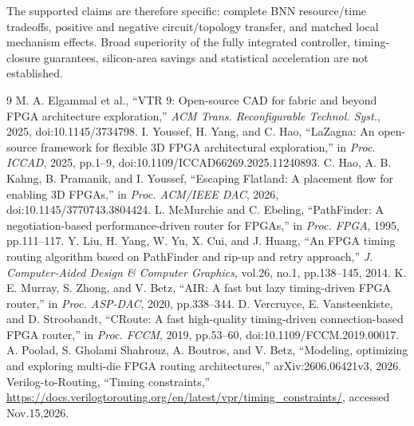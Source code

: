 \documentclass[conference,10pt]{IEEEtran}
\begin{document}
The supported claims are therefore specific: complete BNN resource/time tradeoffs, positive and negative circuit/topology transfer, and matched local mechanism effects. Broad superiority of the fully integrated controller, timing-closure guarantees, silicon-area savings and statistical acceleration are not established.
\begin{thebibliography}{9}
 M. A. Elgammal et al., ``VTR 9: Open-source CAD for fabric and beyond FPGA architecture exploration,'' \emph{ACM Trans. Reconfigurable Technol. Syst.}, 2025, doi:10.1145/3734798.
 I. Youssef, H. Yang, and C. Hao, ``LaZagna: An open-source framework for flexible 3D FPGA architectural exploration,'' in \emph{Proc. ICCAD}, 2025, pp.1--9, doi:10.1109/ICCAD66269.2025.11240893.
 C. Hao, A. B. Kahng, B. Pramanik, and I. Youssef, ``Escaping Flatland: A placement flow for enabling 3D FPGAs,'' in \emph{Proc. ACM/IEEE DAC}, 2026, doi:10.1145/3770743.3804424.
 L. McMurchie and C. Ebeling, ``PathFinder: A negotiation-based performance-driven router for FPGAs,'' in \emph{Proc. FPGA}, 1995, pp.111--117.
 Y. Liu, H. Yang, W. Yu, X. Cui, and J. Huang, ``An FPGA timing routing algorithm based on PathFinder and rip-up and retry approach,'' \emph{J. Computer-Aided Design \& Computer Graphics}, vol.26, no.1, pp.138--145, 2014.
 K. E. Murray, S. Zhong, and V. Betz, ``AIR: A fast but lazy timing-driven FPGA router,'' in \emph{Proc. ASP-DAC}, 2020, pp.338--344.
 D. Vercruyce, E. Vansteenkiste, and D. Stroobandt, ``CRoute: A fast high-quality timing-driven connection-based FPGA router,'' in \emph{Proc. FCCM}, 2019, pp.53--60, doi:10.1109/FCCM.2019.00017.
 A. Poolad, S. Gholami Shahrouz, A. Boutros, and V. Betz, ``Modeling, optimizing and exploring multi-die FPGA routing architectures,'' arXiv:2606.06421v3, 2026.
 Verilog-to-Routing, ``Timing constraints,'' \url{https://docs.verilogtorouting.org/en/latest/vpr/timing_constraints/}, accessed Nov.15,2026.
\end{thebibliography}
\end{document}
